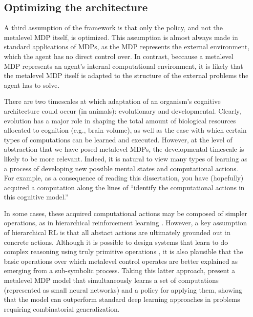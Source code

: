 \subsection{Optimizing the architecture}\label{sec:optimize-architecture}

A third assumption of the framework is that only the policy, and not the metalevel MDP itself, is optimized. This assumption is almost always made in standard applications of MDPs, as the MDP represents the external environment, which the agent has no direct control over. In contrast, beccause a metalevel MDP represents an agent's internal computational environment, it is likely that the metalevel MDP itself is adapted to the structure of the external problems the agent has to solve.

There are two timescales at which adaptation of an organism's cognitive architecture could occur (in animals): evolutionary and developmental. Clearly, evolution has a major role in shaping the total amount of biological resources allocated to cognition (e.g., brain volume), as well as the ease with which certain types of computations can be learned and executed. However, at the level of abstraction that we have posed metalevel MDPs, the developmental timescale is likely to be more relevant. Indeed, it is natural to view many types of learning as a process of developing new possible mental states and computational actions. For example, as a consequence of reading this dissertation, you have (hopefully) acquired a computation along the lines of ``identify the computational actions in this cognitive model.''

In some cases, these acquired computational actions may be composed of simpler operations, as in hierarchical reinforcement learning \citep{sutton1999mdps,dietterich2000hierarchical,bacon2016optioncritic}. However, a key assumption of hierarchical RL is that all abstact actions are ultimately grounded out in concrete actions. Although it is possible to design systems that learn to do complex reasoning using truly primitive operations \citep{piantadosi2019logical}, it is also plausible that the basic operations over which metalevel control operates are better explained as emerging from a sub-symbolic process. Taking this latter approach, \citet{chang2019automatically} present a metalevel MDP model that simultaneously learns a set of computations (represented as small neural networks) and a policy for applying them, showing that the model can outperform standard deep learning approaches in problems requiring combinatorial generalization.


